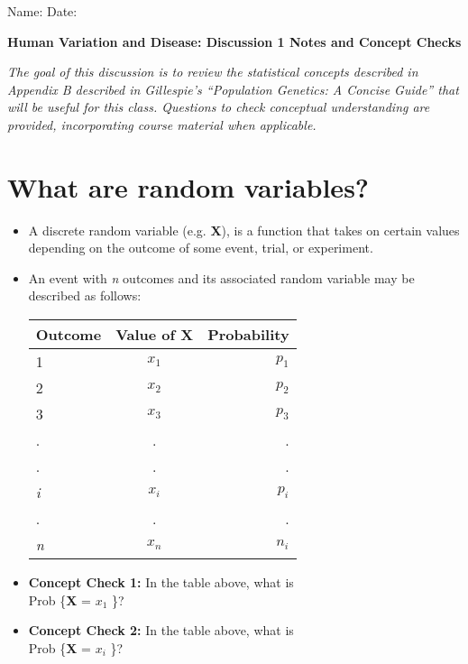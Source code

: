 \documentclass[12pt]{report}
\begin{document}
Name: \hrulefill
Date: \hrulefill

\begin{center}

\bigskip
\large{\textbf{Human Variation and Disease: Discussion 1 Notes and Concept Checks}}

\bigskip
\normalsize{\textit{The goal of this discussion is to review the statistical concepts described in Appendix B described in Gillespie's ``Population Genetics: A Concise Guide'' that will be useful for this class. Questions to check conceptual understanding are provided, incorporating course material when applicable.}}

\end{center}

\section{What are random variables?}

\begin{itemize}

\item A discrete random variable (e.g. \textbf{X}), is a function that takes on certain values depending on the outcome of some event, trial, or experiment.

\item An event with \textit{n} outcomes and its associated random variable may be described as follows:

\begin{tabular}{| l | c | r |}
	\hline
 Outcome & Value of \textbf{X} & Probability \\ \hline
  1 & \textit{$x_{1}$} & \textit{$p_{1}$} \\
  2 & \textit{$x_{2}$}  & \textit{$p_{2}$} \\
  3 & \textit{$x_{3}$} & \textit{$p_{3}$} \\
  . & . & . \\
  . & . & . \\
  \textit{i} & \textit{$x_{i}$}  & \textit{$p_{i}$} \\
  . & .  & . \\
  \textit{n} & \textit{$x_{n}$}  & \textit{$n_{i}$} \\ \hline
\end{tabular}

\bigskip
\item \textbf{Concept Check 1:} In the table above, what is \\ Prob \{{\textbf{X} = \textit{$x_{1}$} }\}? \hrulefill

\item \textbf{Concept Check 2:} In the table above, what is \\ Prob \{{\textbf{X} = \textit{$x_{i}$} }\}? \hrulefill


\end{itemize}
\end{document}
